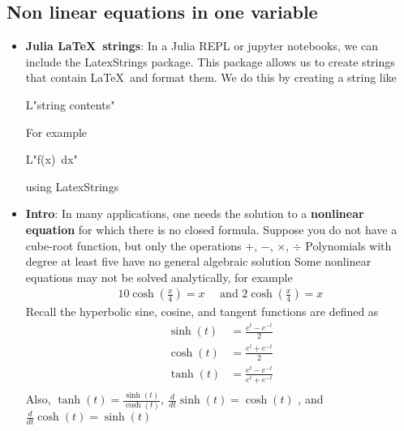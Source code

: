 \documentclass{report}
\begin{document}
    \subsection{Non linear equations in one variable}
    \begin{itemize}
        \item \textbf{Julia \LaTeX \ strings}: In a Julia REPL or jupyter notebooks, we can include the LatexStrings package. This package allows us to create strings that contain \LaTeX \ and format them. We do this by creating a string like
            \begin{center}
                L"string contents"
            \end{center}
            For example
            \begin{center}
                L"\int f(x)\ dx"
            \end{center}
            \bigbreak \noindent 
            \begin{jlcode}
            using LatexStrings
            \end{jlcode}
        \item \textbf{Intro}: In many applications, one needs the solution to a \textbf{nonlinear equation} for which there is no closed formula.
            \bigbreak \noindent 
            Suppose you do not have a cube-root function, but only the operations $+$, $-$, $\times$, $\div$
            \bigbreak \noindent 
             Polynomials with degree at least five have no general algebraic solution
             \bigbreak \noindent 
             Some nonlinear equations may not be solved analytically, for example
             \begin{align*}
                 10\cosh{\left(\frac{x}{4}\right)} = x \quad \text{ and } 2\cosh{\left(\frac{x}{4}\right)} = x
             \end{align*}
             Recall the hyperbolic sine, cosine, and tangent functions are defined as
             \begin{align*}
                 \sinh{\left(t\right)} &= \frac{e^{t} - e^{-t}}{2} \\
                 \cosh{\left(t\right)} &= \frac{e^{t} + e^{-t}}{2} \\
                 \tanh{\left(t\right)} &= \frac{e^{t} - e^{-t}}{e^{t} + e^{-t}} \\
             \end{align*}
             Also, $\tanh{(t)} = \frac{\sinh{(t)}}{\cosh{(t)}},\ \frac{d}{dt}\sinh{(t)} = \cosh{(t)}$ , and $\frac{d}{dt}\cosh{(t)} = \sinh{(t)} $

\end{itemize}
\end{document}
